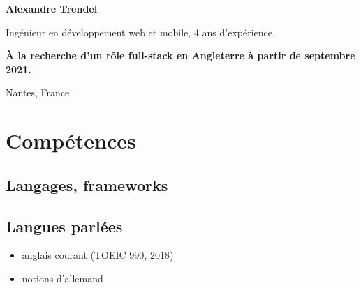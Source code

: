 \documentclass{cv}
\begin{document}
\pagestyle{empty}

\noindent\textbf{\color{solviolet} \LARGE Alexandre Trendel}\medskip

\noindent\begin{minipage}[t]{0.6\textwidth}
	Ingénieur en développement web et mobile, 4 ans d'expérience. \smallskip
	
	\textbf{À la recherche d'un rôle full-stack en Angleterre à partir de septembre 2021.}

	\smallskip{\color{solviolet}\rule{3cm}{1.5pt}}
\end{minipage}\hfill%
\begin{minipage}[t]{0.3\textwidth}%
	 Nantes, France
	\newline{} %
	\newline{} \href{mailto:%
	}{\link{%
	}}%
	\newline{} \href{https://github.com/xou816}{} 
	
\end{minipage}

\vspace{1ex}

\section{Compétences}

\noindent%
\begin{minipage}[t]{0.4\textwidth}
	\subsection{Langages, frameworks}

	\begin{center}
		  
		  
		 
		  
		  
	\end{center}
\end{minipage}\hfill%
\begin{minipage}[t]{0.4\textwidth}
	\subsection{Langues parlées}

	\begin{itemize}
		\item anglais courant (TOEIC 990, 2018)
		\item notions d'allemand
	\end{itemize}
\end{minipage}
\end{document}

